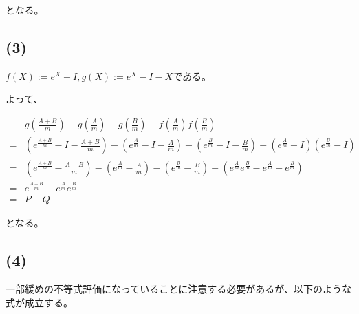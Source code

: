 \documentclass[a4paper, 10pt, dvipdfmx]{jlreq}
\begin{document}
となる。

\subsection*{(3)}

$f(X):=e^X-I,g(X):=e^X-I-X$である。

よって、

\begin{align*}
      & g\left(\frac{A+B}{m}\right)-g\left(\frac{A}{m}\right)-g\left(\frac{B}{m}\right)-f\left(\frac{A}{m}\right)f\left(\frac{B}{m}\right)                                                                         \\
    = & \left(e^{\frac{A+B}{m}}-I-\frac{A+B}{m}\right)-\left(e^{\frac{A}{m}}-I-\frac{A}{m}\right)-\left(e^{\frac{B}{m}}-I-\frac{B}{m}\right)-\left(e^{\frac{A}{m}}-I\right)\left(e^{\frac{B}{m}}-I\right)          \\
    = & \left(e^{\frac{A+B}{m}}-\frac{A+B}{m}\right)-\left(e^{\frac{A}{m}}-\frac{A}{m}\right)-\left(e^{\frac{B}{m}}-\frac{B}{m}\right)-\left(e^{\frac{A}{m}}e^{\frac{B}{m}}-e^{\frac{A}{m}}-e^{\frac{B}{m}}\right) \\
    = & e^{\frac{A+B}{m}}-e^{\frac{A}{m}}e^{\frac{B}{m}}                                                                                                                                                           \\
    = & P-Q
\end{align*}

となる。

\subsection*{(4)}

一部緩めの不等式評価になっていることに注意する必要があるが、以下のような式が成立する。
\end{document}
